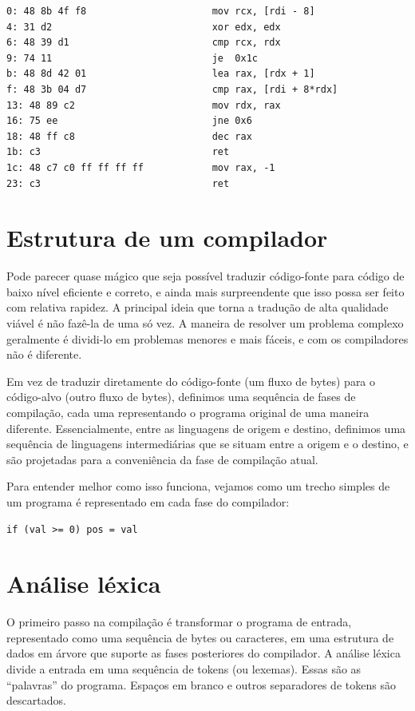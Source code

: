 \begin{verbatim}
0: 48 8b 4f f8                      mov rcx, [rdi - 8]
4: 31 d2                            xor edx, edx
6: 48 39 d1                         cmp rcx, rdx
9: 74 11                            je  0x1c
b: 48 8d 42 01                      lea rax, [rdx + 1]
f: 48 3b 04 d7                      cmp rax, [rdi + 8*rdx]
13: 48 89 c2                        mov rdx, rax
16: 75 ee                           jne 0x6
18: 48 ff c8                        dec rax
1b: c3                              ret
1c: 48 c7 c0 ff ff ff ff            mov rax, -1
23: c3                              ret
\end{verbatim}

\section{Estrutura de um compilador}

Pode parecer quase mágico que seja possível traduzir código-fonte
para código de baixo nível eficiente e correto, e ainda mais
surpreendente que isso possa ser feito com relativa rapidez. A
principal ideia que torna a tradução de alta qualidade viável é não
fazê-la de uma só vez. A maneira de resolver um problema complexo
geralmente é dividi-lo em problemas menores e mais fáceis, e com os
compiladores não é diferente.

Em vez de traduzir diretamente do código-fonte (um fluxo de bytes)
para o código-alvo (outro fluxo de bytes), definimos uma sequência de
fases de compilação, cada uma representando o programa original de
uma maneira diferente. Essencialmente, entre as linguagens de origem
e destino, definimos uma sequência de linguagens intermediárias que
se situam entre a origem e o destino, e são projetadas para a
conveniência da fase de compilação atual.

Para entender melhor como isso funciona, vejamos como um trecho simples
de um programa é representado em cada fase do compilador:

\begin{verbatim}
if (val >= 0) pos = val
\end{verbatim}

\section{Análise léxica}

O primeiro passo na compilação é transformar o programa de entrada,
representado como uma sequência de bytes ou caracteres, em uma
estrutura de dados em árvore que suporte as fases posteriores do
compilador. A análise léxica divide a entrada em uma sequência de
tokens (ou lexemas). Essas são as ``palavras'' do programa. Espaços
em branco e outros separadores de tokens são descartados.

